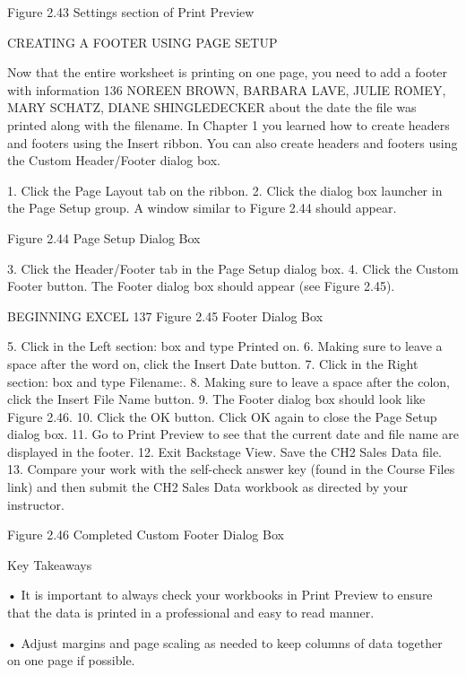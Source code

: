 Figure 2.43 Settings section of Print Preview


CREATING A FOOTER USING PAGE SETUP

Now that the entire worksheet is printing on one page, you need to add a footer with information
136 NOREEN BROWN, BARBARA LAVE, JULIE ROMEY, MARY SCHATZ, DIANE SHINGLEDECKER
about the date the file was printed along with the filename. In Chapter 1 you learned how to create
headers and footers using the Insert ribbon. You can also create headers and footers using the Custom
Header/Footer dialog box.

1. Click the Page Layout tab on the ribbon.
2. Click the dialog box launcher in the Page Setup group. A window similar to Figure 2.44 should
appear.




Figure 2.44 Page Setup Dialog Box


3. Click the Header/Footer tab in the Page Setup dialog box.
4. Click the Custom Footer button. The Footer dialog box should appear (see Figure 2.45).




BEGINNING EXCEL 137
Figure 2.45 Footer Dialog Box


5.   Click in the Left section: box and type Printed on.
6.   Making sure to leave a space after the word on, click the Insert Date button.
7.   Click in the Right section: box and type Filename:.
8.   Making sure to leave a space after the colon, click the Insert File Name button.
9.   The Footer dialog box should look like Figure 2.46.
10.   Click the OK button. Click OK again to close the Page Setup dialog box.
11.   Go to Print Preview to see that the current date and file name are displayed in the footer.
12.   Exit Backstage View. Save the CH2 Sales Data file.
13.   Compare your work with the self-check answer key (found in the Course Files link) and then
submit the CH2 Sales Data workbook as directed by your instructor.




Figure 2.46 Completed Custom Footer Dialog Box




Key Takeaways


• It is important to always check your workbooks in Print Preview to ensure that the data is printed in a
professional and easy to read manner.

• Adjust margins and page scaling as needed to keep columns of data together on one page if possible.



